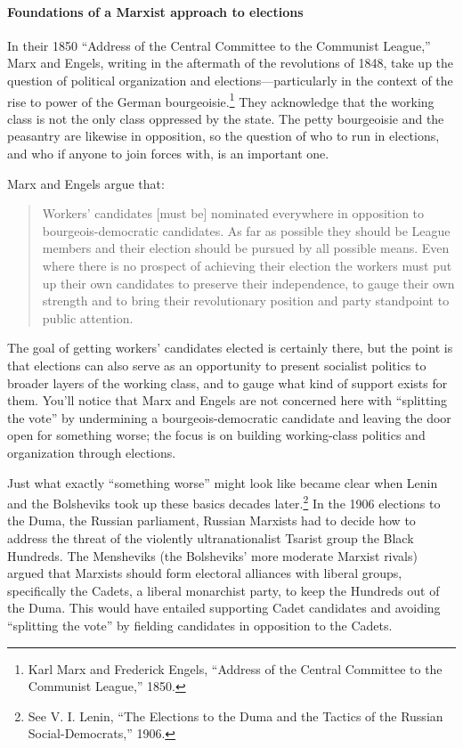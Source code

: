 \paragraph{Foundations of a Marxist approach to elections}

In their 1850 ``Address of the Central Committee to the Communist League,'' Marx and Engels, writing in the aftermath of the revolutions of 1848, take up the question of political organization and elections---particularly in the context of the rise to power of the German bourgeoisie.\footnote{Karl Marx and Frederick Engels, ``Address of the Central Committee to the Communist League,'' 1850.} They acknowledge that the working class is not the only class oppressed by the state. The petty bourgeoisie and the peasantry are likewise in opposition, so the question of who to run in elections, and who if anyone to join forces with, is an important one.

Marx and Engels argue that:

\blockquote{Workers' candidates [must be] nominated everywhere in opposition to bourgeois-democratic candidates. As far as possible they should be League members and their election should be pursued by all possible means. Even where there is no prospect of achieving their election the workers must put up their own candidates to preserve their independence, to gauge their own strength and to bring their revolutionary position and party standpoint to public attention.}

The goal of getting workers' candidates elected is certainly there, but the point is that elections can also serve as an opportunity to present socialist politics to broader layers of the working class, and to gauge what kind of support exists for them. You'll notice that Marx and Engels are not concerned here with ``splitting the vote'' by undermining a bourgeois-democratic candidate and leaving the door open for something worse; the focus is on building working-class politics and organization through elections.

Just what exactly ``something worse'' might look like became clear when Lenin and the Bolsheviks took up these basics decades later.\footnote{See V. I. Lenin, ``The Elections to the Duma and the Tactics of the Russian Social-Democrats,'' 1906.} In the 1906 elections to the Duma, the Russian parliament, Russian Marxists had to decide how to address the threat of the violently ultranationalist Tsarist group the Black Hundreds. The Mensheviks (the Bolsheviks' more moderate Marxist rivals) argued that Marxists should form electoral alliances with liberal groups, specifically the Cadets, a liberal monarchist party, to keep the Hundreds out of the Duma. This would have entailed supporting Cadet candidates and avoiding ``splitting the vote'' by fielding candidates in opposition to the Cadets.

